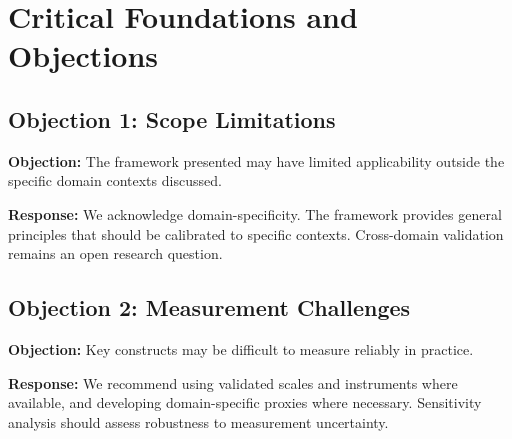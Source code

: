 %
%


\section{Critical Foundations and Objections}
\label{sec:bs-foundations}

\subsection{Objection 1: Scope Limitations}

\textbf{Objection:} The framework presented may have limited applicability
outside the specific domain contexts discussed.

\textbf{Response:} We acknowledge domain-specificity. The framework provides
general principles that should be calibrated to specific contexts. Cross-domain
validation remains an open research question.

\subsection{Objection 2: Measurement Challenges}

\textbf{Objection:} Key constructs may be difficult to measure reliably in
practice.

\textbf{Response:} We recommend using validated scales and instruments where
available, and developing domain-specific proxies where necessary. Sensitivity
analysis should assess robustness to measurement uncertainty.


